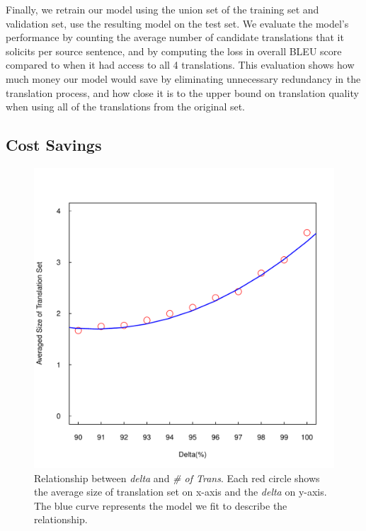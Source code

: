 \documentclass[11pt]{article}
\begin{document}
Finally, we retrain our model using the union set of the training set and validation set, use the resulting model on the test set.  We evaluate the model's performance by counting the average number of candidate translations that it solicits per source sentence, and by computing the loss in overall BLEU score compared to when it had access to all 4 translations.  This evaluation shows how much money our model would save by eliminating unnecessary redundancy in the translation process, and how close it is to the upper bound on translation quality when using all of the translations from the original set.

\subsection{Cost Savings}


\begin{figure}[htbp]
  \centering
  \includegraphics[width=\linewidth]{fitsizedelta/fit.pdf}
  \caption{Relationship between \textit{delta} and \textit{\# of Trans}. Each red circle shows the average size of translation set on x-axis and the \textit{delta} on y-axis. The blue curve represents the model we fit to describe the relationship.}
    \label{fit}
\end{figure}
\end{document}
